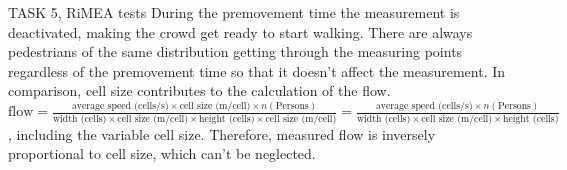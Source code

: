 \documentclass[10pt,a4paper]{article}
\begin{document}
\begin{task}{TASK 5, RiMEA tests}
During the premovement time the measurement is deactivated, making the crowd get ready to start walking. There are always pedestrians of the same distribution getting through the measuring points regardless of the premovement time so that it doesn't affect the measurement. In comparison, cell size contributes to the calculation of the flow. $\text{flow} = \frac{\text{average speed (cells/s)} \times \text{cell size (m/cell)} \times n (\text{Persons}) }{\text{width (cells)} \times \text{cell size (m/cell)} \times \text{height (cells)} \times \text{cell size (m/cell)}} = \frac{\text{average speed (cells/s)} \times n (\text{Persons})}{\text{width (cells)} \times \text{cell size (m/cell)} \times \text{height (cells)}}$, including the variable cell size. Therefore, measured flow is inversely proportional to cell size, which can't be neglected.



\end{task}
\end{document}

